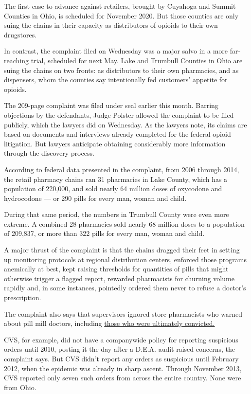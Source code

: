 The first case to advance against retailers, brought by Cuyahoga and
Summit Counties in Ohio, is scheduled for November 2020. But those
counties are only suing the chains in their capacity as distributors of
opioids to their own drugstores.

In contrast, the complaint filed on Wednesday was a major salvo in a
more far-reaching trial, scheduled for next May. Lake and Trumbull
Counties in Ohio are suing the chains on two fronts: as distributors to
their own pharmacies, and as dispensers, whom the counties say
intentionally fed customers' appetite for opioids.

The 209-page complaint was filed under seal earlier this month. Barring
objections by the defendants, Judge Polster allowed the complaint to be
filed publicly, which the lawyers did on Wednesday. As the lawyers note,
its claims are based on documents and interviews already completed for
the federal opioid litigation. But lawyers anticipate obtaining
considerably more information through the discovery process.

According to federal data presented in the complaint, from 2006 through
2014, the retail pharmacy chains ran 31 pharmacies in Lake County, which
has a population of 220,000, and sold nearly 64 million doses of
oxycodone and hydrocodone --- or 290 pills for every man, woman and
child.

During that same period, the numbers in Trumbull County were even more
extreme. A combined 28 pharmacies sold nearly 68 million doses to a
population of 209,837, or more than 322 pills for every man, woman and
child.

A major thrust of the complaint is that the chains dragged their feet in
setting up monitoring protocols at regional distribution centers,
enforced those programs anemically at best, kept raising thresholds for
quantities of pills that might otherwise trigger a flagged report,
rewarded pharmacists for churning volume rapidly and, in some instances,
pointedly ordered them never to refuse a doctor's prescription.

The complaint also says that supervisors ignored store pharmacists who
warned about pill mill doctors, including
\href{https://www.cleveland.com/court-justice/2015/02/akron_doctor_who_illegally_pre.html}{those
who were ultimately convicted.}

CVS, for example, did not have a companywide policy for reporting
suspicious orders until 2010, posting it the day after a D.E.A. audit
raised concerns, the complaint says. But CVS didn't report any orders as
suspicious until February 2012, when the epidemic was already in sharp
ascent. Through November 2013, CVS reported only seven such orders from
across the entire country. None were from Ohio.

